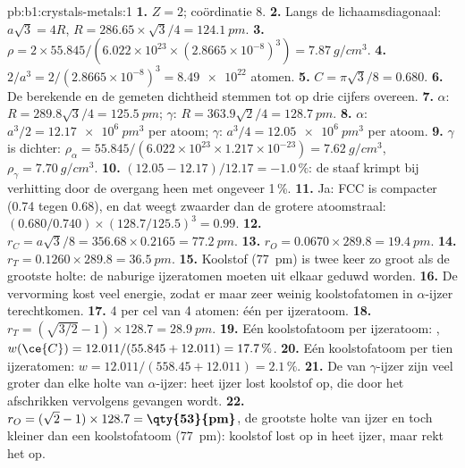 \begin{solution}{pb:b1:crystals-metals:1}
\textbf{1.} $Z = 2$; coördinatie 8.
\textbf{2.} Langs de lichaamsdiagonaal: $a\sqrt3 = 4R$, $R = 286.65 \times
\sqrt3/4 = \qty{124.1}{pm}$.
\textbf{3.} $\rho = 2 \times 55.845/(6.022 \times 10^{23} \times (2.8665
\times 10^{-8})^3) = \qty{7.87}{g/cm^3}$.
\textbf{4.} $2/a^3 = 2/(2.8665 \times 10^{-8})^3 = \num{8.49e22}$ atomen.
\textbf{5.} $C = \pi\sqrt3/8 = 0.680$.
\textbf{6.} De berekende en de gemeten dichtheid stemmen tot op drie
cijfers overeen.
\textbf{7.} $\alpha$: $R = 289.8\sqrt3/4 = \qty{125.5}{pm}$; $\gamma$:
$R = 363.9\sqrt2/4 = \qty{128.7}{pm}$.
\textbf{8.} $\alpha$: $a^3/2 = \qty{12.17e6}{pm^3}$ per atoom; $\gamma$:
$a^3/4 = \qty{12.05e6}{pm^3}$ per atoom.
\textbf{9.} $\gamma$ is dichter: $\rho_\alpha = 55.845/(6.022 \times 10^{23}
\times 1.217 \times 10^{-23}) = \qty{7.62}{g/cm^3}$, $\rho_\gamma =
\qty{7.70}{g/cm^3}$.
\textbf{10.} $(12.05 - 12.17)/12.17 = -1.0\,\%$: de staaf krimpt bij
verhitting door de overgang heen met ongeveer 1\,\%.
\textbf{11.} Ja: FCC is compacter (0.74 tegen 0.68), en dat weegt
zwaarder dan de grotere atoomstraal:
$(0.680/0.740) \times (128.7/125.5)^3 = 0.99$.
\textbf{12.} $r_C = a\sqrt3/8 = 356.68 \times 0.2165 = \qty{77.2}{pm}$.
\textbf{13.} $r_O = 0.0670 \times 289.8 = \qty{19.4}{pm}$.
\textbf{14.} $r_T = 0.1260 \times 289.8 = \qty{36.5}{pm}$.
\textbf{15.} Koolstof (\qty{77}{pm}) is twee keer zo groot als de grootste
holte: de naburige ijzeratomen moeten uit elkaar geduwd worden.
\textbf{16.} De vervorming kost veel energie, zodat er maar zeer weinig
koolstofatomen in $\alpha$-ijzer terechtkomen.
\textbf{17.} 4  per cel van 4 atomen: één per ijzeratoom.
\textbf{18.} $r_T = (\sqrt{3/2} - 1) \times 128.7 = \qty{28.9}{pm}$.
\textbf{19.} Eén koolstofatoom per ijzeratoom: , $w(\ce{C}) = 12.011/(55.845 +
12.011) = 17.7\,\%$.
\textbf{20.} Eén koolstofatoom per tien ijzeratomen: $w = 12.011/(558.45 + 12.011) =
2.1\,\%$.
\textbf{21.} De  van $\gamma$-ijzer zijn veel groter dan
elke holte van $\alpha$-ijzer: heet ijzer lost koolstof op, die door het
afschrikken vervolgens gevangen wordt.
\textbf{22.} $r_O = (\sqrt2 - 1) \times 128.7 = \textbf{\qty{53}{pm}}$, de
grootste holte van ijzer en toch kleiner dan een koolstofatoom
(\qty{77}{pm}): koolstof lost op in heet ijzer, maar rekt het op.
\end{solution}
